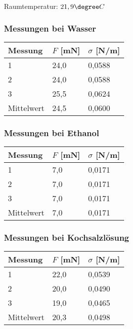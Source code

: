 \documentclass{scrartcl}
\begin{document}
Raumtemperatur: $21,9 \degree C$
\subsubsection{Messungen bei Wasser}

\begin{table}[H]
\begin{center}
\begin{tabular}{l|l|l}
Messung    & $F$ {[}mN{]} & $\sigma$ {[}N/m{]} \\
\hline
1          & 24,0       & 0,0588    \\
2          & 24,0       & 0,0588    \\
3          & 25,5       & 0,0624    \\
Mittelwert & 24,5       & 0,0600                    
\end{tabular}
\end{center}
\label{tab:Wasser}
\end{table}
\subsubsection{Messungen bei Ethanol}

\begin{table}[H]
\begin{center}
\begin{tabular}{l|l|l}
Messung    & $F$ {[}mN{]} & $\sigma$ {[}N/m{]} \\
\hline
1          & 7,0       & 0,0171    \\
2          & 7,0       & 0,0171    \\
3          & 7,0       & 0,0171    \\
Mittelwert & 7,0       & 0,0171                    
\end{tabular}
\end{center}
\label{tab:Ethanol}
\end{table}
\subsubsection{Messungen bei Kochsalzlösung}

\begin{table}[H]
\begin{center}
\begin{tabular}{l|l|l}
Messung    & $F$ {[}mN{]} & $\sigma$ {[}N/m{]} \\
\hline
1          & 22,0       & 0,0539    \\
2          & 20,0       & 0,0490    \\
3          & 19,0       & 0,0465    \\
Mittelwert & 20,3       & 0,0498                    
\end{tabular}
\end{center}
\label{tab:Kochsalz}
\end{table}
\end{document}

